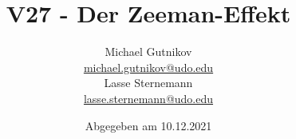 

\title{V27 - Der Zeeman-Effekt}
\author{
  Michael Gutnikov\\
  \href{mailto:michael.gutnikov@udo.edu}{michael.gutnikov@udo.edu}\\
  Lasse Sternemann\\
  \href{mailto:lasse.sternemann@udo.edu}{lasse.sternemann@udo.edu}
}
\date{Abgegeben am 10.12.2021}


    \maketitle
    \newpage
    \tableofcontents
    \newpage

    
    
    
    


    \newpage
    \printbibliography

